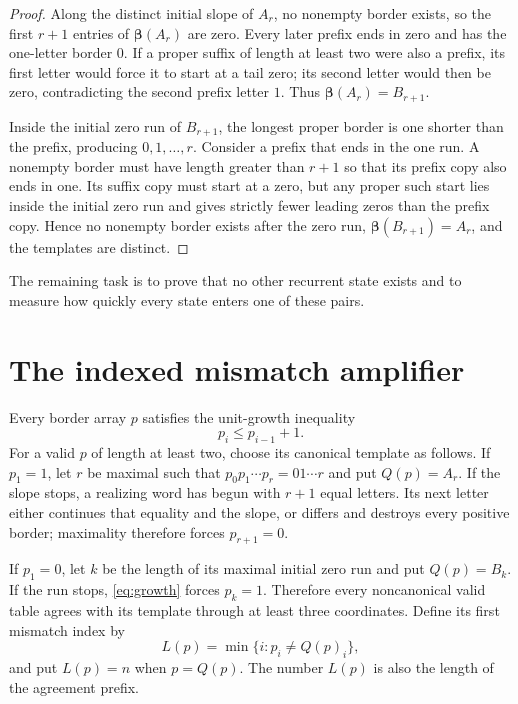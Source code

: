 \documentclass[10pt,a4paper]{amsart}
\theoremstyle{definition}
\theoremstyle{remark}
\newcommand{\BA}{\boldsymbol\beta}
\begin{document}
\begin{proof}
Along the distinct initial slope of $A_r$, no nonempty border exists, so the
first $r+1$ entries of $\BA(A_r)$ are zero.  Every later prefix ends in zero
and has the one-letter border $0$.  If a proper suffix of length at least two
were also a prefix, its first letter would force it to start at a tail zero;
its second letter would then be zero, contradicting the second prefix letter
$1$.  Thus $\BA(A_r)=B_{r+1}$.

Inside the initial zero run of $B_{r+1}$, the longest proper border is one
shorter than the prefix, producing $0,1,\ldots,r$.  Consider a prefix that
ends in the one run.  A nonempty border must have length greater than $r+1$
so that its prefix copy also ends in one.  Its suffix copy must start at a
zero, but any proper such start lies inside the initial zero run and gives
strictly fewer leading zeros than the prefix copy.  Hence no nonempty border
exists after the zero run, $\BA(B_{r+1})=A_r$, and the templates are distinct.
\end{proof}

The remaining task is to prove that no other recurrent state exists and to
measure how quickly every state enters one of these pairs.

\section{The indexed mismatch amplifier}

Every border array $p$ satisfies the unit-growth inequality
\begin{equation}
                         p_i\le p_{i-1}+1.             \label{eq:growth}
\end{equation}
For a valid $p$ of length at least two, choose its canonical template as
follows.  If $p_1=1$, let $r$ be maximal such that
$p_0p_1\cdots p_r=01\cdots r$ and put $Q(p)=A_r$.  If the slope stops, a
realizing word has begun with $r+1$ equal letters.  Its next letter either
continues that equality and the slope, or differs and destroys every
positive border; maximality therefore forces $p_{r+1}=0$.

If $p_1=0$, let $k$ be the length of its maximal initial zero run and put
$Q(p)=B_k$.  If the run stops, \eqref{eq:growth} forces $p_k=1$.  Therefore
every noncanonical valid table agrees with its template through at least
three coordinates.  Define its first mismatch index by
\begin{equation}
 L(p)=\min\{i:p_i\ne Q(p)_i\},                         \label{eq:L}
\end{equation}
and put $L(p)=n$ when $p=Q(p)$.  The number $L(p)$ is also the length of the
agreement prefix.
\end{document}
